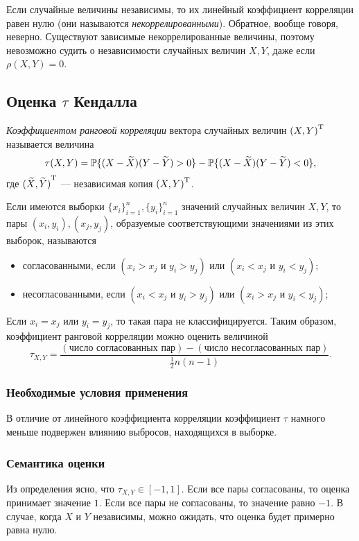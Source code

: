 Если случайные величины независимы, то их линейный коэффициент корреляции равен нулю (они называются \emph{некоррелированными}). Обратное, вообще говоря, неверно. Существуют зависимые некоррелированные величины, поэтому невозможно судить о независимости случайных величин $X, Y$, даже если $\rho(X, Y) = 0$.

\subsection*{Оценка $\tau$ Кендалла}

\begin{define}
\emph{Коэффициентом ранговой корреляции} вектора случайных величин $\trans{(X, Y)}$ называется величина
\begin{equation}
	\tau(X, Y) = \P\{(X - \widetilde{X})(Y - \widetilde{Y}) > 0\} - \P\{(X - \widetilde{X})(Y - \widetilde{Y}) < 0\},
\end{equation}
где $\trans{(\widetilde{X}, \widetilde{Y})}$ --- независимая копия $\trans{(X, Y)}$.
\end{define}

Если имеются выборки $\{x_i\}_{i=1}^n, \{y_i\}_{i=1}^n$ значений случайных величин $X, Y$, то пары $(x_i, y_i), (x_j, y_j)$, образуемые соответствующими значениями из этих выборок, называются
\begin{itemize}
	\item согласованными, если $(x_i > x_j \text{ и } y_i > y_j) \text{ или } (x_i < x_j \text{ и } y_i < y_j)$;
	\item несогласованными, если $(x_i < x_j \text{ и } y_i > y_j) \text{ или } (x_i > x_j \text{ и } y_i < y_j)$;
\end{itemize}
Если $x_i = x_j \text{ или } y_i = y_j$, то такая пара не классифицируется. Таким образом, коэффициент ранговой корреляции можно оценить величиной
\begin{equation}
\tau_{X, Y} = \frac{(\text{число согласованных пар}) - (\text{число несогласованных пар})}{\frac{1}{2}n(n - 1)}.
\end{equation}

\subsubsection*{Необходимые условия применения}
В отличие от линейного коэффициента корреляции коэффициент $\tau$ намного меньше подвержен влиянию выбросов, находящихся в выборке.
\subsubsection*{Семантика оценки}
Из определения ясно, что $\tau_{X, Y} \in [-1, 1]$. Если все пары согласованы, то оценка принимает значение $1$. Если все пары не согласованы, то значение равно $-1$. В случае, когда $X$ и $Y$ независимы, можно ожидать, что оценка будет примерно равна нулю.

